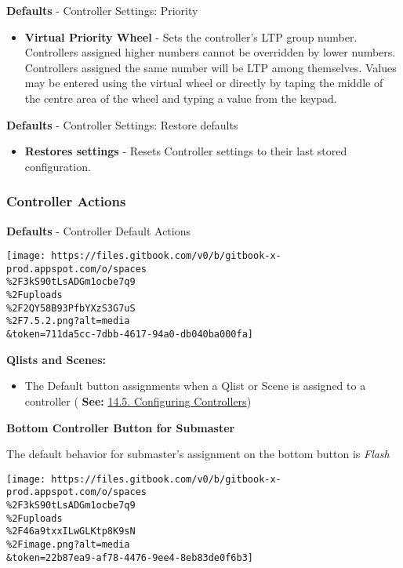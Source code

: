 \documentclass[
]{article}
\providecommand{\tightlist}{%
  \setlength{\itemsep}{0pt}\setlength{\parskip}{0pt}}
\begin{document}
\textbf{Defaults} - Controller Settings: Priority

\begin{itemize}
\tightlist
\item
  \textbf{Virtual Priority Wheel} - Sets the controller's LTP group number. Controllers assigned higher numbers cannot be overridden by lower numbers. Controllers assigned the same number will be LTP among themselves. Values may be entered using the virtual wheel or directly by taping the middle of the centre area of the wheel and typing a value from the keypad.
\end{itemize}

\textbf{Defaults} - Controller Settings: Restore defaults

\begin{itemize}
\tightlist
\item
  \textbf{Restores settings} - Resets Controller settings to their last stored configuration.
\end{itemize}

\hypertarget{controller-actions}{%
\subsubsection{Controller Actions}\label{controller-actions}}

\textbf{Defaults} - Controller Default Actions

\texttt{[image: https://files.gitbook.com/v0/b/gitbook-x-prod.appspot.com/o/spaces\\\%2F3kS90tLsADGm1ocbe7q9\\\%2Fuploads\\\%2F2QY58B93PfbYXzS3G7uS\\\%2F7.5.2.png?alt=media\\\&token=711da5cc-7dbb-4617-94a0-db040ba000fa]}

\textbf{Qlists and Scenes:}

\begin{itemize}
\tightlist
\item
  The Default button assignments when a Qlist or Scene is assigned to a controller ( \textbf{See:} \href{https://vibemanual.compulite.com/playback-controllers.html\#configuring-controllers}{14.5. Configuring Controllers})
\end{itemize}

\textbf{Bottom Controller Button for Submaster}

The default behavior for submaster's assignment on the bottom button is \emph{Flash}

\texttt{[image: https://files.gitbook.com/v0/b/gitbook-x-prod.appspot.com/o/spaces\\\%2F3kS90tLsADGm1ocbe7q9\\\%2Fuploads\\\%2F46a9txxILwGLKtp8K9sN\\\%2Fimage.png?alt=media\\\&token=22b87ea9-af78-4476-9ee4-8eb83de0f6b3]}
\end{document}
